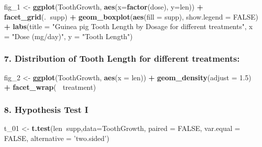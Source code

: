\documentclass[]{article}
\newenvironment{Shaded}{\begin{snugshade}}{\end{snugshade}}
\newcommand{\KeywordTok}[1]{\textcolor[rgb]{0.13,0.29,0.53}{\textbf{#1}}}
\newcommand{\DataTypeTok}[1]{\textcolor[rgb]{0.13,0.29,0.53}{#1}}
\newcommand{\DecValTok}[1]{\textcolor[rgb]{0.00,0.00,0.81}{#1}}
\newcommand{\FloatTok}[1]{\textcolor[rgb]{0.00,0.00,0.81}{#1}}
\newcommand{\StringTok}[1]{\textcolor[rgb]{0.31,0.60,0.02}{#1}}
\newcommand{\OtherTok}[1]{\textcolor[rgb]{0.56,0.35,0.01}{#1}}
\newcommand{\OperatorTok}[1]{\textcolor[rgb]{0.81,0.36,0.00}{\textbf{#1}}}
\newcommand{\NormalTok}[1]{#1}
\begin{document}
\begin{Shaded}
\begin{Highlighting}[]
\NormalTok{fig_}\DecValTok{1}\NormalTok{ <-}\StringTok{ }\KeywordTok{ggplot}\NormalTok{(ToothGrowth, }\KeywordTok{aes}\NormalTok{(}\DataTypeTok{x=}\KeywordTok{factor}\NormalTok{(dose), }\DataTypeTok{y=}\NormalTok{len)) }\OperatorTok{+}
\StringTok{    }\KeywordTok{facet_grid}\NormalTok{(.}\OperatorTok{~}\NormalTok{supp) }\OperatorTok{+}
\StringTok{    }\KeywordTok{geom_boxplot}\NormalTok{(}\KeywordTok{aes}\NormalTok{(}\DataTypeTok{fill =}\NormalTok{ supp), }\DataTypeTok{show.legend =} \OtherTok{FALSE}\NormalTok{) }\OperatorTok{+}
\StringTok{    }\KeywordTok{labs}\NormalTok{(}\DataTypeTok{title =} \StringTok{"Guinea pig Tooth Length by Dosage for different treatments"}\NormalTok{, }
         \DataTypeTok{x =} \StringTok{"Dose (mg/day)"}\NormalTok{,}
         \DataTypeTok{y =} \StringTok{"Tooth Length"}\NormalTok{)}
\end{Highlighting}
\end{Shaded}

\subsubsection{7. Distribution of Tooth Length for different
treatments:}\label{distribution-of-tooth-length-for-different-treatments}

\begin{Shaded}
\begin{Highlighting}[]
\NormalTok{fig_}\DecValTok{2}\NormalTok{ <-}\StringTok{ }\KeywordTok{ggplot}\NormalTok{(ToothGrowth, }\KeywordTok{aes}\NormalTok{(}\DataTypeTok{x =}\NormalTok{ len)) }\OperatorTok{+}
\StringTok{    }\KeywordTok{geom_density}\NormalTok{(}\DataTypeTok{adjust =} \FloatTok{1.5}\NormalTok{) }\OperatorTok{+}\StringTok{ }
\StringTok{    }\KeywordTok{facet_wrap}\NormalTok{(}\OperatorTok{~}\StringTok{ }\NormalTok{treatment)}
\end{Highlighting}
\end{Shaded}

\hypertarget{Appendix_2}{\subsubsection{8. Hypothesis Test
I}\label{Appendix_2}}

\begin{Shaded}
\begin{Highlighting}[]
\NormalTok{t_}\DecValTok{01}\NormalTok{ <-}\StringTok{ }\KeywordTok{t.test}\NormalTok{(len}\OperatorTok{~}\NormalTok{supp,}\DataTypeTok{data=}\NormalTok{ToothGrowth, }\DataTypeTok{paired =} \OtherTok{FALSE}\NormalTok{, }\DataTypeTok{var.equal =} \OtherTok{FALSE}\NormalTok{, }\DataTypeTok{alternative =} \StringTok{'two.sided'}\NormalTok{)}
\end{Highlighting}
\end{Shaded}
\end{document}
